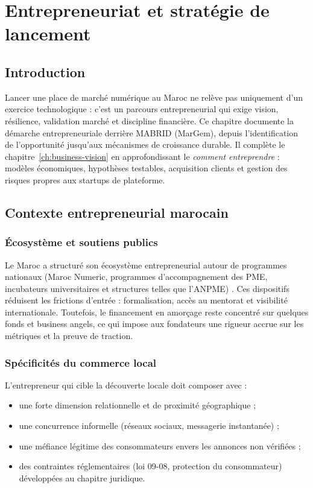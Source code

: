 \chapter{Entrepreneuriat et stratégie de lancement}
\label{ch:entrepreneuriat}

\section{Introduction}

Lancer une place de marché numérique au Maroc ne relève pas uniquement d'un exercice technologique : c'est un parcours entrepreneurial qui exige vision, résilience, validation marché et discipline financière. Ce chapitre documente la démarche entrepreneuriale derrière MABRID (MarGem), depuis l'identification de l'opportunité jusqu'aux mécanismes de croissance durable. Il complète le chapitre~\ref{ch:business-vision} en approfondissant le \emph{comment entreprendre} : modèles économiques, hypothèses testables, acquisition clients et gestion des risques propres aux startups de plateforme.

\section{Contexte entrepreneurial marocain}

\subsection{Écosystème et soutiens publics}

Le Maroc a structuré son écosystème entrepreneurial autour de programmes nationaux (Maroc Numeric, programmes d'accompagnement des PME, incubateurs universitaires et structures telles que l'ANPME) \parencite{mcit2020digital,morocco2025digital}. Ces dispositifs réduisent les frictions d'entrée : formalisation, accès au mentorat et visibilité internationale. Toutefois, le financement en amorçage reste concentré sur quelques fonds et business angels, ce qui impose aux fondateurs une rigueur accrue sur les métriques et la preuve de traction.

\subsection{Spécificités du commerce local}

L'entrepreneur qui cible la découverte locale doit composer avec :
\begin{itemize}
  \item une forte dimension relationnelle et de proximité géographique ;
  \item une concurrence informelle (réseaux sociaux, messagerie instantanée) ;
  \item une méfiance légitime des consommateurs envers les annonces non vérifiées ;
  \item des contraintes réglementaires (loi 09-08, protection du consommateur) développées au chapitre juridique.
\end{itemize}

